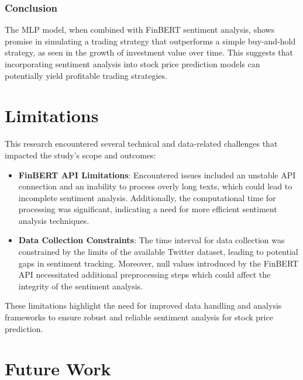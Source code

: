 \documentclass[11pt,a4paper]{article}
\begin{document}
  \subsubsection{Conclusion}
  The MLP model, when combined with FinBERT sentiment analysis, shows promise in simulating a trading strategy that outperforms a simple buy-and-hold strategy, as seen in the growth of investment value over time. This suggests that incorporating sentiment analysis into stock price prediction models can potentially yield profitable trading strategies.
  
  

















  \section{Limitations}

  This research encountered several technical and data-related challenges that impacted the study's scope and outcomes:
  
  \begin{itemize}
    \item \textbf{FinBERT API Limitations}: Encountered issues included an unstable API connection and an inability to process overly long texts, which could lead to incomplete sentiment analysis. Additionally, the computational time for processing was significant, indicating a need for more efficient sentiment analysis techniques.
    
    \item \textbf{Data Collection Constraints}: The time interval for data collection was constrained by the limits of the available Twitter dataset, leading to potential gaps in sentiment tracking. Moreover, null values introduced by the FinBERT API necessitated additional preprocessing steps which could affect the integrity of the sentiment analysis.
  \end{itemize}
  
  These limitations highlight the need for improved data handling and analysis frameworks to ensure robust and reliable sentiment analysis for stock price prediction.
  



  \section{Future Work}
\end{document}
